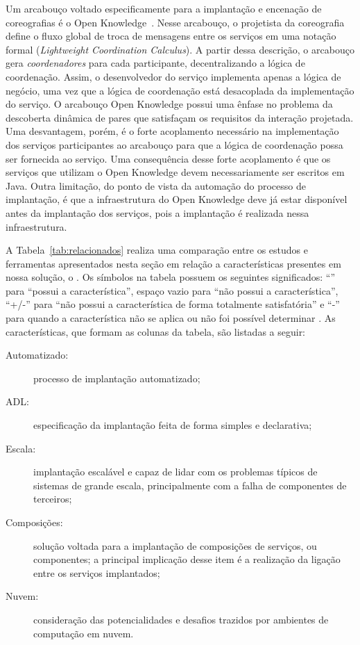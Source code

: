 Um arcabouço voltado especificamente para a implantação e encenação
de coreografias é o Open Knowledge~\cite{Besana2008OpenKnowledge,Siebes2007OK}.
Nesse arcabouço, o projetista da coreografia define o fluxo global
de troca de mensagens entre os serviços em uma notação formal
(\emph{Lightweight Coordination Calculus}).
A partir dessa descrição, o arcabouço gera \emph{coordenadores}
para cada participante, decentralizando a lógica de coordenação.
Assim, o desenvolvedor do serviço implementa apenas a lógica de negócio,
uma vez que a lógica de coordenação está desacoplada da implementação do serviço.
O arcabouço Open Knowledge possui uma ênfase no problema
da descoberta dinâmica de pares que satisfaçam os requisitos
da interação projetada. Uma desvantagem, porém,
é o forte acoplamento necessário na implementação dos serviços participantes
ao arcabouço para que a lógica de coordenação possa ser fornecida ao serviço.
Uma consequência desse forte acoplamento é que os serviços que
utilizam o Open Knowledge devem necessariamente ser escritos em Java.
Outra limitação, do ponto de vista da automação do processo de implantação,
é que a infraestrutura do Open Knowledge deve já estar disponível
antes da implantação dos serviços, pois a implantação é realizada nessa infraestrutura.

A Tabela~\ref{tab:relacionados} realiza uma comparação entre os estudos e ferramentas apresentados nesta seção em relação a características presentes em nossa solução, o \ee. Os símbolos na tabela possuem os seguintes significados: ``\checkmark{}'' para ``possui a característica'', espaço vazio para ``não possui a característica'', ``+/-'' para ``não possui a característica de forma totalmente satisfatória'' e ``-'' para quando a característica não se aplica ou não foi possível determinar . As características, que formam as colunas da tabela, são listadas a seguir:

\begin{description}
\item [Automatizado:] processo de implantação automatizado;
\item [ADL:] especificação da implantação feita de forma simples e declarativa;
\item [Escala:] implantação escalável e capaz de lidar com os problemas típicos de sistemas de grande escala, principalmente com a falha de componentes de terceiros;
\item [Composições:] solução voltada para a implantação de composições de serviços, ou componentes; a principal implicação desse item é a realização da ligação entre os serviços implantados;
\item [Nuvem:] consideração das potencialidades e desafios trazidos por ambientes de computação em nuvem.
\end{description}

